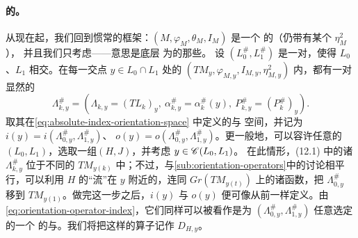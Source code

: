 \paragraph{\trModuliSpace{}的\trOrientation。}\label{sub:orientations-moduli-spaces}
从现在起，我们回到惯常的框架：$(M,\varphi_M,\theta_M,I_M)$ 是一个%
\trCorneredBoundary{}的\trExactSymplectic\trManifold（仍带有某个 $\eta_M^2$），
并且我们只考虑\trExactLagrangianBrane——意思是底层\trLagrange\trSubmanifold{}
为\trExact{}的那些\trBrane。
设 $(L_0^{\#},L_1^{\#})$ 是一对\trExactLagrangianBrane，使得 $L_0$、$L_1$
\trTransverse{}相交。在每一交点 $y\in L_0\cap L_1$ 处的%
\trTangentSpace{}$(TM_y,\varphi_{M,y},I_{M,y},\eta^2_{M,y})$ 内，都有一对显然的%
\trLinear\trLagrange\trBrane
\begin{equation}\label{eq:linear-brane-pair}
\Lambda^{\#}_{k,y}=(\Lambda_{k,y}=(TL_k)_y,\ \alpha^{\#}_{k,y}=\alpha_k^{\#}(y),\
P^{\#}_{k,y}=(P_k^{\#})_y).
\end{equation}
取其在\eqref{eq:absolute-index-orientation-space} 中定义的\trIndex{}与%
\trOrientation{}空间，并记为 $i(y)=i(\Lambda^{\#}_{0,y},\Lambda^{\#}_{1,y})$、
$o(y)=o(\Lambda^{\#}_{0,y},\Lambda^{\#}_{1,y})$。更一般地，可以容许任意的
$(L_0,L_1)$，选取一组\trFloerDatum{}$(H,J)$，并考虑 $y\in\mathscr{C}(L_0,L_1)$。
在此情形，(12.1) 中的诸 $\Lambda^{\#}_{k,y}$ 位于\trApriori{}不同的\trVectorSpace{}
$TM_{y(k)}$ 中；不过，与\cref{sub:orientation-operators}中的讨论相平行，可以利用
$H$ 的\trHamiltonian{}“流”在 $y$ 附近的\trLinearization，连同
$Gr(TM_{y(t)})$ 上的诸\trSquaredPhase{}函数，把 $\Lambda^{\#}_{0,y}$ 移到
$TM_{y(1)}$。做完这一步之后，$i(y)$ 与 $o(y)$ 便可像从前一样定义。由
\eqref{eq:orientation-operator-index}，它们同样可以被看作是为
$(\Lambda^{\#}_{0,y},\Lambda^{\#}_{1,y})$ 任意选定的一个\trOrientationOperator{}
的\trIndex{}与\trDeterminantLine。我们将把这样的算子记作 $D_{H,y}$。

